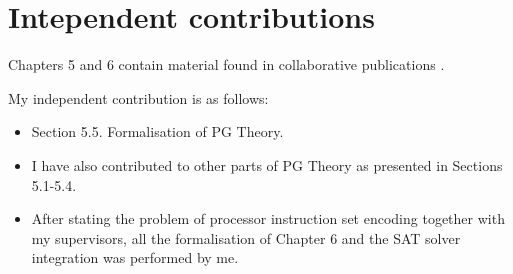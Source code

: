 \documentclass[12pt]{article}
\begin{document}
\thispagestyle{empty}

\section*{Intependent contributions}


Chapters 5 and 6 contain material found in collaborative publications \cite{cpog_encoding,pg_algebra}.

My independent contribution is as follows:

\begin{itemize}
\item
Section 5.5. Formalisation of PG Theory.
\item
I have also contributed to other parts of PG Theory as presented in Sections 5.1-5.4.
\item
After stating the problem of processor instruction set encoding together with my supervisors,
all the formalisation of Chapter 6 and the SAT solver integration was performed by me.
\end{itemize}



\end{document}
